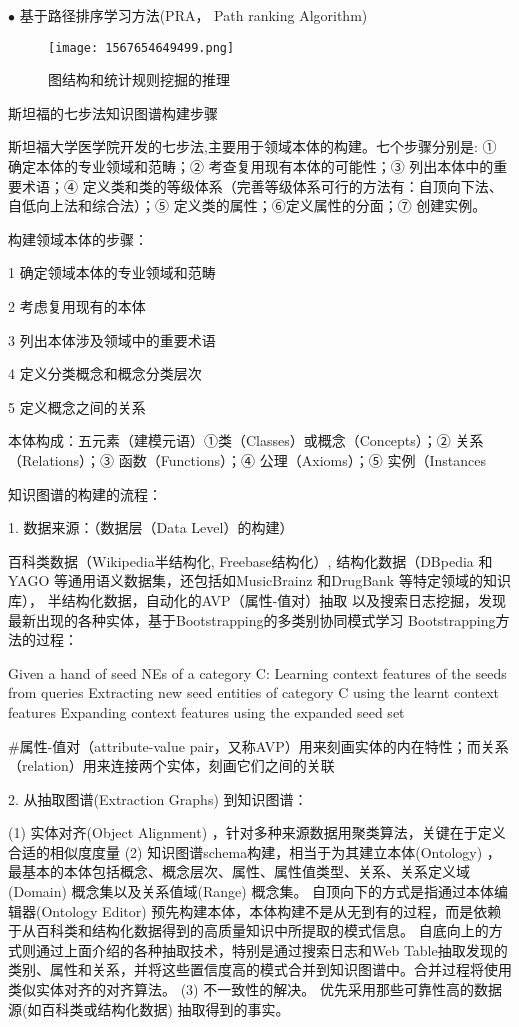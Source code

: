 $\bullet$ 基于路径排序学习⽅法(PRA， Path ranking Algorithm)
\begin{figure}[H]
\centering
\texttt{[image: 1567654649499.png]}
\caption{图结构和统计规则挖掘的推理}
\label{AI321567654649499}
\end{figure}

斯坦福的七步法知识图谱构建步骤

斯坦福大学医学院开发的七步法,主要用于领域本体的构建。七个步骤分别是: ① 确定本体的专业领域和范畴；② 考查复用现有本体的可能性；③ 列出本体中的重要术语；④ 定义类和类的等级体系（完善等级体系可行的方法有：自顶向下法、自低向上法和综合法）；⑤ 定义类的属性；⑥定义属性的分面；⑦ 创建实例。

构建领域本体的步骤：

1 确定领域本体的专业领域和范畴

2 考虑复用现有的本体

3 列出本体涉及领域中的重要术语

4 定义分类概念和概念分类层次

5 定义概念之间的关系

本体构成：五元素（建模元语）①类（Classes）或概念（Concepts）；② 关系（Relations）；③ 函数（Functions）；④ 公理（Axioms）；⑤ 实例（Instances


知识图谱的构建的流程：

1. 数据来源：（数据层（Data Level）的构建）

百科类数据（Wikipedia半结构化, Freebase结构化）,
结构化数据（DBpedia 和YAGO 等通用语义数据集，还包括如MusicBrainz 和DrugBank 等特定领域的知识库），
半结构化数据，自动化的AVP（属性-值对）抽取
以及搜索日志挖掘，发现最新出现的各种实体，基于Bootstrapping的多类别协同模式学习
      Bootstrapping方法的过程：

    Given a hand of seed NEs of a category C:
    Learning context features of the seeds from queries
    Extracting new seed entities of category C using the learnt context  features
    Expanding context features using the expanded seed set

\#属性-值对（attribute-value pair，又称AVP）用来刻画实体的内在特性；而关系（relation）用来连接两个实体，刻画它们之间的关联

2. 从抽取图谱(Extraction Graphs) 到知识图谱：

(1) 实体对齐(Object Alignment) ，针对多种来源数据用聚类算法，关键在于定义合适的相似度度量
(2) 知识图谱schema构建，相当于为其建立本体(Ontology) ，最基本的本体包括概念、概念层次、属性、属性值类型、关系、关系定义域(Domain) 概念集以及关系值域(Range) 概念集。
自顶向下的方式是指通过本体编辑器(Ontology Editor) 预先构建本体，本体构建不是从无到有的过程，而是依赖于从百科类和结构化数据得到的高质量知识中所提取的模式信息。
自底向上的方式则通过上面介绍的各种抽取技术，特别是通过搜索日志和Web Table抽取发现的类别、属性和关系，并将这些置信度高的模式合并到知识图谱中。合并过程将使用类似实体对齐的对齐算法。
(3) 不一致性的解决。
优先采用那些可靠性高的数据源(如百科类或结构化数据) 抽取得到的事实。

